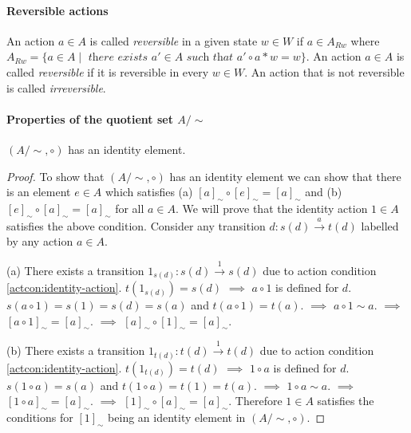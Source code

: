 	\paragraph{Reversible actions}
	An action $a \in A$ is called \textit{reversible} in a given state $w \in W$ if $a \in A_{R w}$ where $A_{Rw} = \{a \in A \mid\textit{ there exists }a' \in A\textit{ such that }a' \circ a * w = w \}$.
	An action $a \in A$ is called \textit{reversible} if it is reversible in every $w \in W$.
	An action that is not reversible is called \textit{irreversible}.

	\paragraph{Properties of the quotient set $A/\sim$}

	\begin{proposition}\label{prp:Asim-identity}
		$(A/\sim, \circ)$ has an identity element.
	\end{proposition}
	\begin{proof}
		To show that $(A/\sim, \circ)$ has an identity element we can show that there is an element $e \in A$ which satisfies (a) $[a]_{\sim} \circ [e]_{\sim} = [a]_{\sim}$ and (b) $[e]_{\sim} \circ [a]_{\sim} = [a]_{\sim}$ for all $a \in A$.
		We will prove that the identity action $1 \in A$ satisfies the above condition.
		Consider any transition $d: s(d) \xrightarrow{a} t(d)$ labelled by any action $a \in A$.

		(a) There exists a transition $1_{s(d)}: s(d) \xrightarrow{1} s(d)$ due to action condition \ref{actcon:identity-action}.
		$t(1_{s(d)})=s(d)$ $\implies$ $a \circ 1$ is defined for $d$.
		$s(a \circ 1) = s(1) = s(d) = s(a)$ and $t(a \circ 1) = t(a)$.
		$\implies$ $a \circ 1 \sim a$.
		$\implies$ $[a \circ 1]_{\sim} = [a]_{\sim}$.
		$\implies$ $[a]_{\sim} \circ [1]_{\sim} = [a]_{\sim}$.

		(b) There exists a transition $1_{t(d)}: t(d) \xrightarrow{1} t(d)$ due to action condition \ref{actcon:identity-action}.
		$t(1_{t(d)})=t(d)$ $\implies$ $1 \circ a$ is defined for $d$.
		$s(1 \circ a)=s(a)$ and $t(1 \circ a) = t(1) = t(a)$.
		$\implies$ $1 \circ a \sim a$.
		$\implies$ $[1 \circ a]_{\sim} = [a]_{\sim}$.
		$\implies$ $[1]_{\sim} \circ [a]_{\sim} = [a]_{\sim}$.
		Therefore $1 \in A$ satisfies the conditions for $[1]_{\sim}$ being an identity element in $(A/\sim, \circ)$.
	\end{proof}

